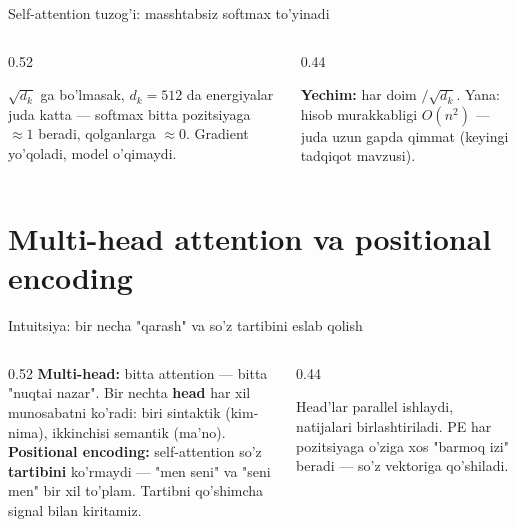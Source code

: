 \documentclass[aspectratio=169,11pt]{beamer}
\begin{document}
\begin{frame}{Self-attention tuzog'i: masshtabsiz softmax to'yinadi}
  \begin{columns}[T]
    \begin{column}{0.52\textwidth}
      \begin{tcolorbox}[warnbox,title={$\sqrt{d_k}$ ni unutish}]
        \small
        $\sqrt{d_k}$ ga bo'lmasak, $d_k=512$ da energiyalar juda katta ---
        softmax bitta pozitsiyaga $\approx 1$ beradi, qolganlarga $\approx 0$.
        Gradient yo'qoladi, model o'qimaydi.
      \end{tcolorbox}
    \end{column}
    \begin{column}{0.44\textwidth}
      \begin{tcolorbox}[okbox,top=2pt,bottom=2pt]
        \footnotesize
        \textbf{Yechim:} har doim $/\sqrt{d_k}$. Yana: hisob murakkabligi
        $O(n^2)$ --- juda uzun gapda qimmat (keyingi tadqiqot mavzusi).
      \end{tcolorbox}
    \end{column}
  \end{columns}
\end{frame}

\section[Multi-head va PE]{Multi-head attention va positional encoding}

\begin{frame}{Intuitsiya: bir necha "qarash" va so'z tartibini eslab qolish}
  \begin{columns}[T]
    \begin{column}{0.52\textwidth}
      \small
      \textbf{Multi-head:} bitta attention --- bitta "nuqtai nazar". Bir nechta
      \textbf{head} har xil munosabatni ko'radi: biri sintaktik (kim-nima),
      ikkinchisi semantik (ma'no).\\[5pt]
      \textbf{Positional encoding:} self-attention so'z \textbf{tartibini}
      ko'rmaydi --- "men seni" va "seni men" bir xil to'plam. Tartibni
      qo'shimcha signal bilan kiritamiz.
    \end{column}
    \begin{column}{0.44\textwidth}
      \begin{tcolorbox}[okbox,top=2pt,bottom=2pt]
        \footnotesize
        Head'lar parallel ishlaydi, natijalari birlashtiriladi. PE har
        pozitsiyaga o'ziga xos "barmoq izi" beradi --- so'z vektoriga
        qo'shiladi.
      \end{tcolorbox}
    \end{column}
  \end{columns}
\end{frame}
\end{document}
